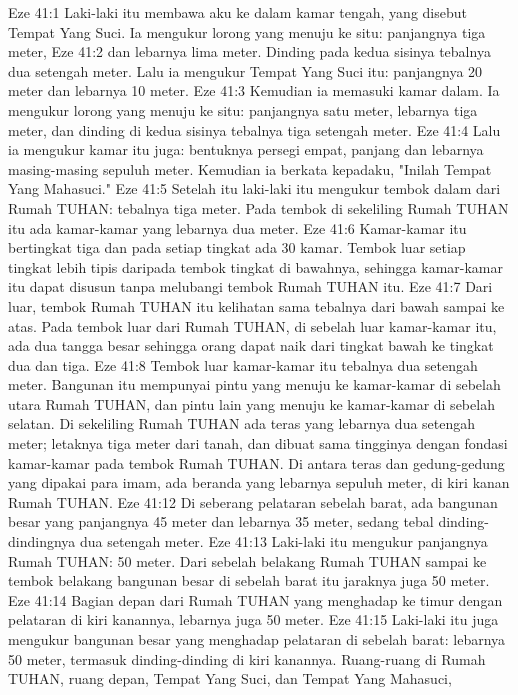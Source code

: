Eze 41:1  Laki-laki itu membawa aku ke dalam kamar tengah, yang disebut Tempat Yang Suci. Ia mengukur lorong yang menuju ke situ: panjangnya tiga meter,
Eze 41:2  dan lebarnya lima meter. Dinding pada kedua sisinya tebalnya dua setengah meter. Lalu ia mengukur Tempat Yang Suci itu: panjangnya 20 meter dan lebarnya 10 meter.
Eze 41:3  Kemudian ia memasuki kamar dalam. Ia mengukur lorong yang menuju ke situ: panjangnya satu meter, lebarnya tiga meter, dan dinding di kedua sisinya tebalnya tiga setengah meter.
Eze 41:4  Lalu ia mengukur kamar itu juga: bentuknya persegi empat, panjang dan lebarnya masing-masing sepuluh meter. Kemudian ia berkata kepadaku, "Inilah Tempat Yang Mahasuci."
Eze 41:5  Setelah itu laki-laki itu mengukur tembok dalam dari Rumah TUHAN: tebalnya tiga meter. Pada tembok di sekeliling Rumah TUHAN itu ada kamar-kamar yang lebarnya dua meter.
Eze 41:6  Kamar-kamar itu bertingkat tiga dan pada setiap tingkat ada 30 kamar. Tembok luar setiap tingkat lebih tipis daripada tembok tingkat di bawahnya, sehingga kamar-kamar itu dapat disusun tanpa melubangi tembok Rumah TUHAN itu.
Eze 41:7  Dari luar, tembok Rumah TUHAN itu kelihatan sama tebalnya dari bawah sampai ke atas. Pada tembok luar dari Rumah TUHAN, di sebelah luar kamar-kamar itu, ada dua tangga besar sehingga orang dapat naik dari tingkat bawah ke tingkat dua dan tiga.
Eze 41:8  Tembok luar kamar-kamar itu tebalnya dua setengah meter. Bangunan itu mempunyai pintu yang menuju ke kamar-kamar di sebelah utara Rumah TUHAN, dan pintu lain yang menuju ke kamar-kamar di sebelah selatan. Di sekeliling Rumah TUHAN ada teras yang lebarnya dua setengah meter; letaknya tiga meter dari tanah, dan dibuat sama tingginya dengan fondasi kamar-kamar pada tembok Rumah TUHAN. Di antara teras dan gedung-gedung yang dipakai para imam, ada beranda yang lebarnya sepuluh meter, di kiri kanan Rumah TUHAN.
Eze 41:12  Di seberang pelataran sebelah barat, ada bangunan besar yang panjangnya 45 meter dan lebarnya 35 meter, sedang tebal dinding-dindingnya dua setengah meter.
Eze 41:13  Laki-laki itu mengukur panjangnya Rumah TUHAN: 50 meter. Dari sebelah belakang Rumah TUHAN sampai ke tembok belakang bangunan besar di sebelah barat itu jaraknya juga 50 meter.
Eze 41:14  Bagian depan dari Rumah TUHAN yang menghadap ke timur dengan pelataran di kiri kanannya, lebarnya juga 50 meter.
Eze 41:15  Laki-laki itu juga mengukur bangunan besar yang menghadap pelataran di sebelah barat: lebarnya 50 meter, termasuk dinding-dinding di kiri kanannya. Ruang-ruang di Rumah TUHAN, ruang depan, Tempat Yang Suci, dan Tempat Yang Mahasuci,
